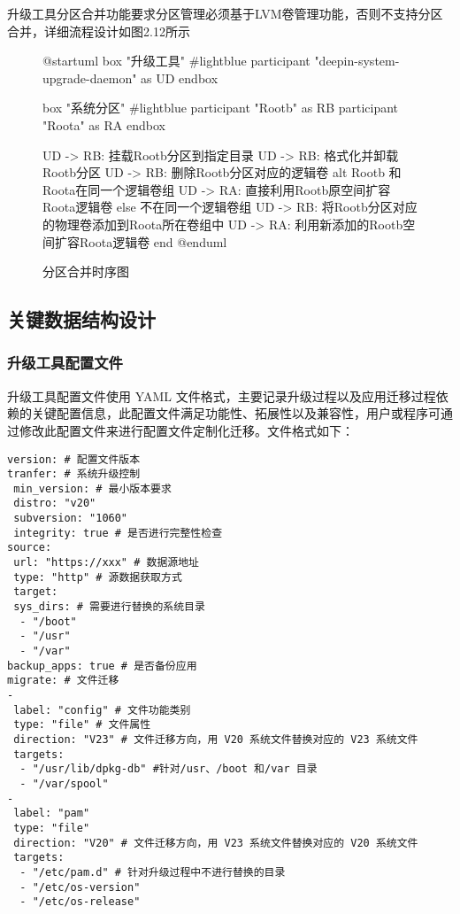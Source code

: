 \documentclass{utart}
\begin{document}
升级工具分区合并功能要求分区管理必须基于LVM卷管理功能，否则不支持分区合并，详细流程设计如图2.12所示
\begin{figure}
    \centering
    \begin{plantuml}
        @startuml
        box "升级工具" #lightblue
        participant "deepin-system-upgrade-daemon" as UD
        endbox

        box "系统分区" #lightblue
        participant "Rootb" as RB
        participant "Roota" as RA
        endbox

        UD -> RB: 挂载Rootb分区到指定目录
        UD -> RB: 格式化并卸载Rootb分区
        UD -> RB: 删除Rootb分区对应的逻辑卷
        alt Rootb 和 Roota在同一个逻辑卷组
        UD -> RA: 直接利用Rootb原空间扩容Roota逻辑卷
        else 不在同一个逻辑卷组
        UD -> RB: 将Rootb分区对应的物理卷添加到Roota所在卷组中
        UD -> RA: 利用新添加的Rootb空间扩容Roota逻辑卷
        end
        @enduml
    \end{plantuml}
    \caption{分区合并时序图}
    \label{fig:partition}
\end{figure}

\subsection{关键数据结构设计}

\subsubsection{升级工具配置文件}
升级工具配置文件使用 YAML 文件格式，主要记录升级过程以及应用迁移过程依赖的关键配置信息，此配置文件满足功能性、拓展性以及兼容性，用户或程序可通过修改此配置文件来进行配置文件定制化迁移。文件格式如下：

\begin{verbatim}
version: # 配置文件版本
tranfer: # 系统升级控制
 min_version: # 最小版本要求
 distro: "v20"
 subversion: "1060"
 integrity: true # 是否进行完整性检查
source:
 url: "https://xxx" # 数据源地址
 type: "http" # 源数据获取方式
 target:
 sys_dirs: # 需要进行替换的系统目录
  - "/boot"
  - "/usr"
  - "/var"
backup_apps: true # 是否备份应用
migrate: # 文件迁移
-
 label: "config" # 文件功能类别
 type: "file" # 文件属性
 direction: "V23" # 文件迁移方向，用 V20 系统文件替换对应的 V23 系统文件
 targets:
  - "/usr/lib/dpkg-db" #针对/usr、/boot 和/var 目录
  - "/var/spool"
-
 label: "pam"
 type: "file"
 direction: "V20" # 文件迁移方向，用 V23 系统文件替换对应的 V20 系统文件
 targets:
  - "/etc/pam.d" # 针对升级过程中不进行替换的目录
  - "/etc/os-version"
  - "/etc/os-release"
\end{verbatim}
\end{document}
